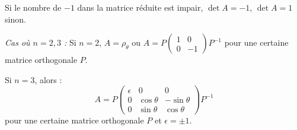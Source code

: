 \documentclass[class=report,crop=false]{standalone}
\begin{document}
\begin{remarque*}
Si le nombre de $-1$ dans la matrice réduite est impair, $\det A = -1$, $\det A = 1$ sinon. 
\end{remarque*}

{\it Cas où $n=2,3$ :}
Si $n=2$, $A = \rho_\theta$ ou $A = P\left(\begin{array}{cc}
1 & 0\\
0 & -1
\end{array}\right) P^{-1}$ pour une certaine matrice orthogonale $P$.

Si $n=3$, alors : 
\[A=P\left(\begin{array}{ccc}
\epsilon &0&0\\
0&\cos \theta & -\sin \theta \\
0&\sin \theta & \cos \theta
\end{array}\right)P^{-1}\]
pour une certaine matrice orthogonale $P$ et $\epsilon = \pm 1$. 
\end{document}

